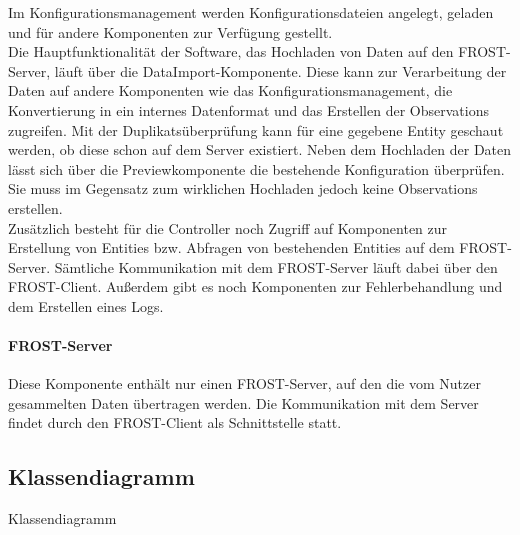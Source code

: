Im Konfigurationsmanagement werden Konfigurationsdateien angelegt, geladen und für andere Komponenten zur Verfügung gestellt.\\

Die Hauptfunktionalität der Software, das Hochladen von Daten auf den FROST-Server, läuft über die DataImport-Komponente.
Diese kann zur Verarbeitung der Daten auf andere Komponenten wie das Konfigurationsmanagement, die Konvertierung in ein internes Datenformat und das Erstellen der Observations zugreifen.
Mit der Duplikatsüberprüfung kann für eine gegebene Entity geschaut werden, ob diese schon auf dem Server existiert.
Neben dem Hochladen der Daten lässt sich über die Previewkomponente die bestehende Konfiguration überprüfen.
Sie muss im Gegensatz zum wirklichen Hochladen jedoch keine Observations erstellen.\\

Zusätzlich besteht für die Controller noch Zugriff auf Komponenten zur Erstellung von Entities bzw. Abfragen von bestehenden Entities auf dem FROST-Server.
Sämtliche Kommunikation mit dem FROST-Server läuft dabei über den FROST-Client.
Außerdem gibt es noch Komponenten zur Fehlerbehandlung und dem Erstellen eines Logs.

\paragraph{FROST-Server}
Diese Komponente enthält nur einen FROST-Server, auf den die vom Nutzer gesammelten Daten übertragen werden.
Die Kommunikation mit dem Server findet durch den FROST-Client als Schnittstelle statt.

\subsection{Klassendiagramm}

Klassendiagramm